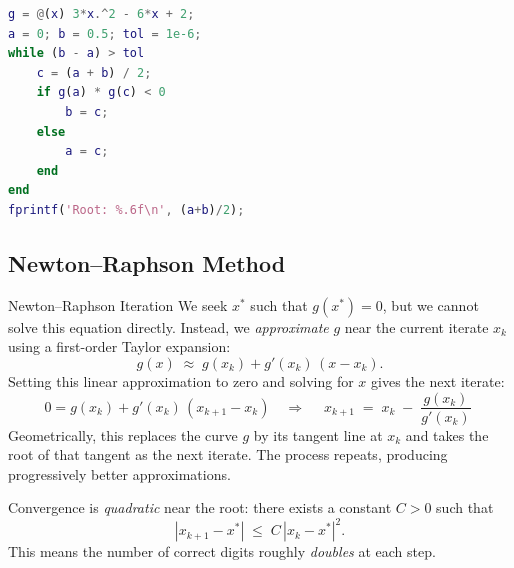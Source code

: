 \begin{lstlisting}[language=Matlab,caption={Bisection method in MATLAB.}]
g = @(x) 3*x.^2 - 6*x + 2;
a = 0; b = 0.5; tol = 1e-6;
while (b - a) > tol
    c = (a + b) / 2;
    if g(a) * g(c) < 0
        b = c;
    else
        a = c;
    end
end
fprintf('Root: %.6f\n', (a+b)/2);
\end{lstlisting}

\subsection{Newton--Raphson Method}

\begin{defnbox}{Newton--Raphson Iteration}
	We seek $x^*$ such that $g(x^*)=0$, but we cannot solve this equation directly. Instead, we \emph{approximate} $g$ near the current iterate $x_k$ using a first-order Taylor expansion:
	\[
	g(x) \;\approx\; g(x_k) + g'(x_k)\,(x - x_k).
	\]
	Setting this linear approximation to zero and solving for $x$ gives the next iterate:
	\[
	0 = g(x_k) + g'(x_k)\,(x_{k+1} - x_k)
	\quad\Longrightarrow\quad
	{\;x_{k+1} \;=\; x_k \;-\; \frac{g(x_k)}{g'(x_k)}\;}
	\]
	Geometrically, this replaces the curve $g$ by its tangent line at $x_k$ and takes the root of that tangent as the next iterate. The process repeats, producing progressively better approximations.

	Convergence is \emph{quadratic} near the root: there exists a constant $C>0$ such that
	\[
	|x_{k+1}-x^*| \;\le\; C\,|x_k-x^*|^2.
	\]
	This means the number of correct digits roughly \emph{doubles} at each step.
\end{defnbox}

